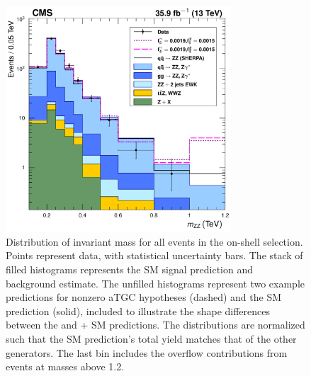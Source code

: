\begin{figure}[htbp]
  \begin{center}
    \includegraphics[width=0.75\textwidth]{results/zzMass_aTGC.pdf}
    \caption[{\ZZ} invariant mass distribution with example aTGC working points]{
        Distribution of {\ZZ} invariant mass for all events in the on-shell selection.
        Points represent data, with statistical uncertainty bars.
        The stack of filled histograms represents the SM signal prediction and background estimate.
        The unfilled histograms represent two example {\SHERPA} predictions for nonzero aTGC hypotheses (dashed) and the {\SHERPA} SM prediction (solid), included to illustrate the shape differences between the {\SHERPA} and {\POWHEG}+{\MCFM} SM predictions.
        The {\SHERPA} distributions are normalized such that the SM prediction's total yield matches that of the other generators.
        The last bin includes the overflow contributions from events at masses above {1.2\TeV}.
      }\label{fig:aTGC}
  \end{center}
\end{figure}

